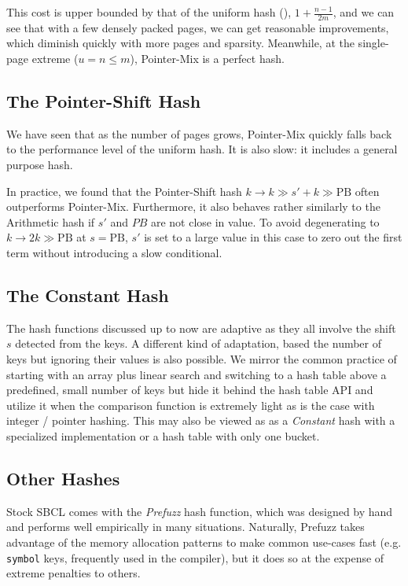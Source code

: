 \documentclass[sigconf]{acmart}
\newcommand*\lisp[1]{\texttt{#1}}
\renewcommand{\label}[1]{%
    \gdef\sfname{sf:##1}}%
\begin{document}
This cost is upper bounded by that of the uniform hash (), $1+\frac{n-1}{2m}$, and we can see that with a few densely packed pages, we can get reasonable improvements, which diminish quickly with more pages and sparsity.
Meanwhile, at the single-page extreme ($u=n\leqslant m$), Pointer-Mix is a perfect hash.

\subsection{The Pointer-Shift Hash}
\label{sec:the-pointer-shift-hash}

We have seen that as the number of pages grows, Pointer-Mix quickly falls back to the performance level of the uniform hash.
It is also slow: it includes a general purpose hash.

In practice, we found that the Pointer-Shift hash $k \rightarrow k \gg s' + k \gg \mathrm{PB}$ often outperforms Pointer-Mix.
Furthermore, it also behaves rather similarly to the Arithmetic hash if $s'$ and $PB$ are not close in value.
To avoid degenerating to $k \rightarrow 2 k \gg \mathrm{PB}$ at $s=\mathrm{PB}$, $s'$ is set to a large value in this case to zero out the first term without introducing a slow conditional.

\subsection{The Constant Hash}

The hash functions discussed up to now are adaptive as they all involve the shift $s$ detected from the keys.
A different kind of adaptation, based the number of keys but ignoring their values is also possible.
We mirror the common practice of starting with an array plus linear search and switching to a hash table above a predefined, small number of keys but hide it behind the hash table API and utilize it when the comparison function is extremely light as is the case with integer / pointer hashing.
This may also be viewed as as a \emph{Constant} hash with a specialized implementation or a hash table with only one bucket.

\subsection{Other Hashes}

Stock SBCL comes with the \emph{Prefuzz} hash function, which was designed by hand and performs well empirically in many situations.
Naturally, Prefuzz takes advantage of the memory allocation patterns to make common use-cases fast (e.g. \lisp{symbol} keys, frequently used in the compiler), but it does so at the expense of extreme penalties to others.
\end{document}

